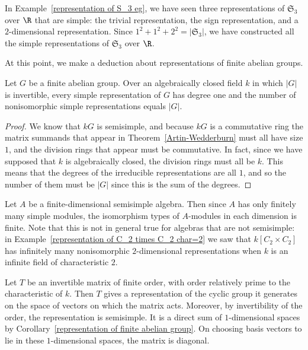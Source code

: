 \begin{example}
In Example~\ref{representation of S_3 eg}, we have seen three representations of $\mathfrak{S}_3$ over $\R$ that are simple: the trivial representation, the sign representation, and a $2$-dimensional representation. Since $1^2+1^2+2^2=|\mathfrak{S}_3|$, we have constructed
all the simple representations of $\mathfrak{S}_3$ over $\R$.
\end{example}
At this point, we make a deduction about representations of finite abelian
groups.
\begin{corollary}\label{representation of finite abelian group}
Let $G$ be a finite abelian group. Over an algebraically closed field $k$ in which $|G|$ is invertible, every simple representation of $G$ has degree one and the number of nonisomorphic simple representations equals $|G|$.
\end{corollary}
\begin{proof}
We know that $kG$ is semisimple, and because $kG$ is a commutative ring the matrix summands that appear in Theorem~\ref{Artin-Wedderburn} must all have size $1$, and the division rings that appear must be commutative. In fact, since we have supposed that $k$ is algebraically closed, the division rings must all be $k$. This means that the degrees of the irreducible representations are all $1$, and so the number of them must be $|G|$ since this is the sum of the degrees.
\end{proof}
\begin{example}
Let $A$ be a finite-dimensional semisimple algebra. Then since $A$ has only finitely many simple modules, the isomorphism types of $A$-modules in each dimension is finite. Note that this is not in general true for algebras that are not semisimple: in Example~\ref{representation of C_2 times C_2 char=2} we saw that $k[C_2\times C_2]$ has infinitely many nonisomorphic $2$-dimensional representations when $k$ is an infinite field of characteristic $2$.
\end{example}
\begin{example}
Let $T$ be an invertible matrix of finite order, with order relatively prime to the characteristic of $k$. Then $T$ gives a representation of the cyclic group it generates on the space of vectors on which the matrix acts. Moreover, by invertibility of the order, the representation is semisimple. It is a direct sum of $1$-dimensional spaces by Corollary~\ref{representation of finite abelian group}. On choosing basis vectors to lie in these $1$-dimensional spaces, the matrix is diagonal.
\end{example}
